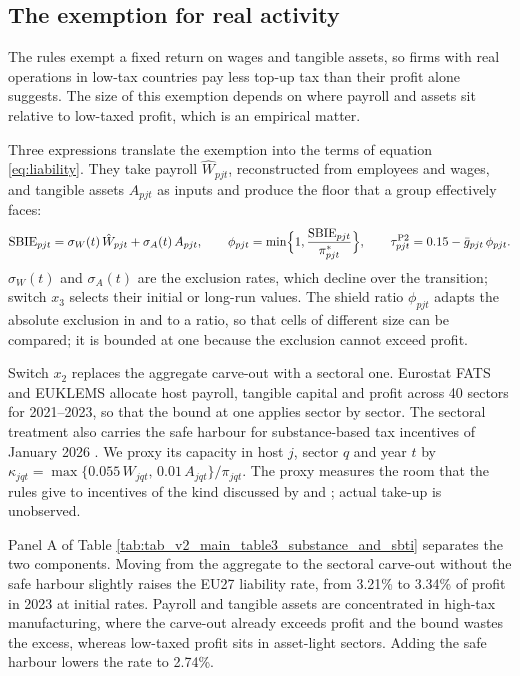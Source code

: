 \documentclass[11pt,a4paper]{article}
\begin{document}
\subsection{The exemption for real activity}\label{sec:substance}

The rules exempt a fixed return on wages and tangible assets, so firms with real operations in low-tax countries pay less top-up tax than their profit alone suggests. The size of this exemption depends on where payroll and assets sit relative to low-taxed profit, which is an empirical matter.

Three expressions translate the exemption into the terms of equation \eqref{eq:liability}. They take payroll $\hat W_{pjt}$, reconstructed from employees and wages, and tangible assets $A_{pjt}$ as inputs and produce the floor that a group effectively faces:
\begin{equation}\label{eq:sbie}
\mathrm{SBIE}_{pjt}=\sigma_W(t)\,\hat W_{pjt}+\sigma_A(t)\,A_{pjt},\qquad
\phi_{pjt}=\min\Bigl\{1,\frac{\mathrm{SBIE}_{pjt}}{\pi^{*}_{pjt}}\Bigr\},\qquad
\tau^{\mathrm{P2}}_{pjt}=0.15-\bar g_{pjt}\,\phi_{pjt}.
\end{equation}
$\sigma_W(t)$ and $\sigma_A(t)$ are the exclusion rates, which decline over the transition; switch $x_3$ selects their initial or long-run values. The shield ratio $\phi_{pjt}$ adapts the absolute exclusion in \citet{devereux2023} and \citet{hugger2026} to a ratio, so that cells of different size can be compared; it is bounded at one because the exclusion cannot exceed profit.

Switch $x_2$ replaces the aggregate carve-out with a sectoral one. Eurostat FATS and EUKLEMS allocate host payroll, tangible capital and profit across 40 sectors for 2021–2023, so that the bound at one applies sector by sector. The sectoral treatment also carries the safe harbour for substance-based tax incentives of January 2026 \citep{oecd2026}. We proxy its capacity in host $j$, sector $q$ and year $t$ by $\kappa_{jqt}=\max\{0.055\,W_{jqt},\,0.01\,A_{jqt}\}/\pi_{jqt}$. The proxy measures the room that the rules give to incentives of the kind discussed by \citet{ferreiraliotti2022} and \citet{schjelderup2024}; actual take-up is unobserved.



Panel A of Table \ref{tab:tab_v2_main_table3_substance_and_sbti} separates the two components. Moving from the aggregate to the sectoral carve-out without the safe harbour slightly raises the EU27 liability rate, from 3.21\% to 3.34\% of profit in 2023 at initial rates. Payroll and tangible assets are concentrated in high-tax manufacturing, where the carve-out already exceeds profit and the bound wastes the excess, whereas low-taxed profit sits in asset-light sectors. Adding the safe harbour lowers the rate to 2.74\%.
\end{document}
